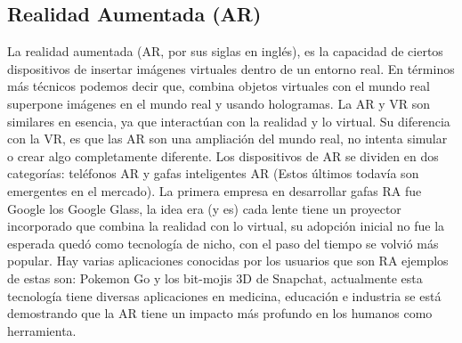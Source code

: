 \documentclass[a4paper,10pt]{article}
\begin{document}
	\subsection{Realidad Aumentada (AR)}
	La realidad aumentada (AR, por sus siglas en inglés), es la capacidad de ciertos dispositivos de insertar imágenes virtuales dentro de un entorno real. En términos más técnicos podemos decir que, combina objetos virtuales con el mundo real superpone imágenes en el mundo real y usando hologramas. La AR y VR son similares en esencia, ya que interactúan con la realidad y lo virtual. Su diferencia con la VR, es que las AR son una ampliación del mundo real, no intenta simular o crear algo completamente diferente. Los dispositivos de AR se dividen en dos categorías: teléfonos AR y gafas inteligentes AR (Estos últimos todavía son emergentes en el mercado). La primera empresa en desarrollar gafas RA fue Google los Google Glass, la idea era (y es) cada lente tiene un proyector incorporado que combina la realidad con lo virtual, su adopción inicial no fue la esperada quedó como tecnología de nicho, con el paso del tiempo se volvió más popular. Hay varias aplicaciones conocidas por los usuarios que son RA ejemplos de estas son: Pokemon Go y los bit-mojis 3D de Snapchat, actualmente esta tecnología tiene diversas aplicaciones en medicina, educación e industria se está demostrando que la AR tiene un impacto más profundo en los humanos como herramienta.
	
\end{document}
